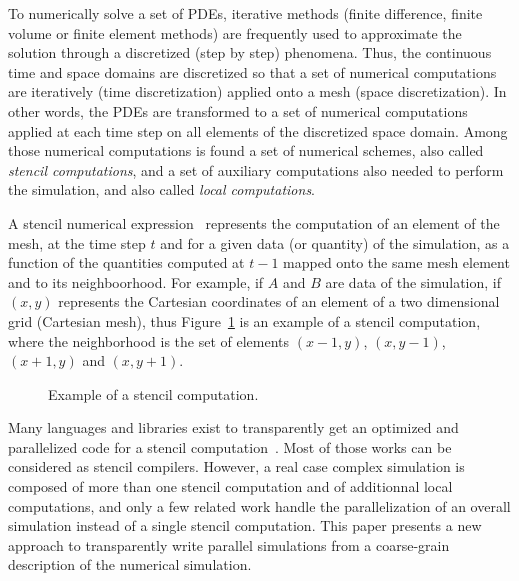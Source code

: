 To numerically solve a set of PDEs, iterative methods (finite difference, finite volume or finite element methods) are frequently used to approximate the solution through a discretized (step by step) phenomena. Thus, the continuous time and space domains are discretized so that a set of numerical computations are iteratively (time discretization) applied onto a mesh (space discretization). In other words, the PDEs are transformed to a set of numerical computations applied at each time step on all elements of the discretized space domain. Among those numerical computations is found a set of numerical schemes, also called \textit{stencil computations}, and a set of auxiliary computations also needed to perform the simulation, and also called \emph{local computations}.

A stencil numerical expression~\cite{spaaTangCKLL11} represents the computation of an element of the mesh, at the time step $t$ and for a given data (or quantity) of the simulation, as a function of the quantities computed at $t-1$ mapped onto the same mesh element and to its neighboorhood. For example, if $A$ and $B$ are data of the simulation, if $(x,y)$ represents the Cartesian coordinates of an element of a two dimensional grid (Cartesian mesh), thus Figure~\ref{fig:ex} is an example of a stencil computation, where the neighborhood is the set of elements $(x-1,y)$, $(x,y-1)$, $(x+1,y)$ and $(x,y+1)$.

\begin{figure}[!h]\begin{center}
  \caption{Example of a stencil computation.}
  \label{fig:ex}
\end{center}\end{figure}

Many languages and libraries exist to transparently get an optimized and parallelized code for a stencil computation~\cite{spaaTangCKLL11,citeulike12258902,Giles2011,DeVito2011LDS}. Most of those works can be considered as stencil compilers. However, a real case complex simulation is composed of more than one stencil computation and of additionnal local computations, and only a few related work handle the parallelization of an overall simulation instead of a single stencil computation. This paper presents a new approach to transparently write parallel simulations from a coarse-grain description of the numerical simulation.

